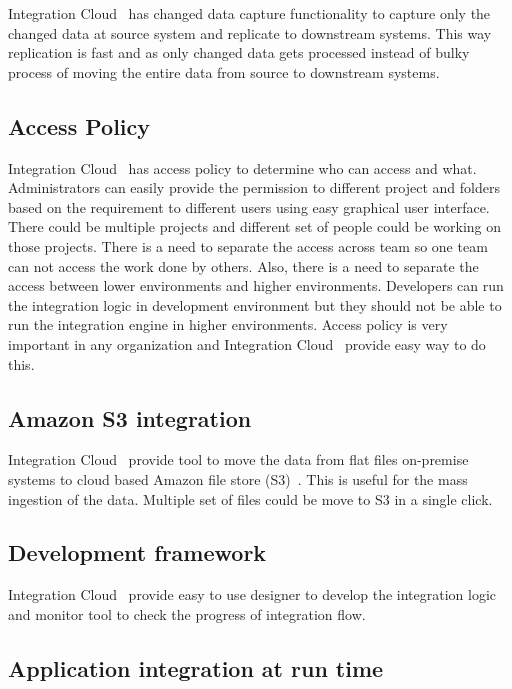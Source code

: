 Integration Cloud~\cite{hid-sp18-511-iics} has changed data capture
functionality to capture only the changed data at source system and
replicate to downstream systems. This way replication is fast and as
only changed data gets processed instead of bulky process of moving
the entire data from source to downstream systems.

\subsection{Access Policy}

Integration Cloud~\cite{hid-sp18-511-iics} has access policy to
determine who can access and what. Administrators can easily provide
the permission to different project and folders based on the
requirement to different users using easy graphical user
interface. There could be multiple projects and different set of
people could be working on those projects. There is a need to separate
the access across team so one team can not access the work done by
others. Also, there is a need to separate the access between lower
environments and higher environments. Developers can run the
integration logic in development environment but they should not be
able to run the integration engine in higher environments. Access
policy is very important in any organization and Integration
Cloud~\cite{hid-sp18-511-iics} provide easy way to do this.

\subsection{Amazon S3 integration}

Integration Cloud~\cite{hid-sp18-511-iics} provide tool to move the
data from flat files on-premise systems to cloud based Amazon file
store (S3)~\cite{hid-sp18-511-aws-s3}. This is useful for the mass
ingestion of the data. Multiple set of files could be move to S3 in a
single click.

\subsection{Development framework}

Integration Cloud~\cite{hid-sp18-511-iics} provide easy to use
designer to develop the integration logic and monitor tool to check
the progress of integration flow.

\subsection{Application integration at run time}

